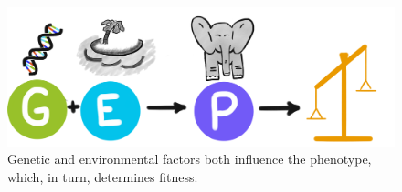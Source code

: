 \begin{figure}
 \centering
 \includegraphics[width=\textwidth]{img/bioscheme}
 \caption{Genetic and environmental factors both influence the phenotype, which, in turn, determines fitness.}
 \label{fig:bioscheme}
\end{figure}